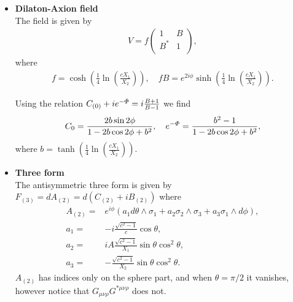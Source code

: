 \documentclass[11pt]{article}
\let\oldPhi=\Phi
\renewcommand{\Phi}{\mathnormal{\oldPhi}}
\begin{document}
\begin{itemize}
  \item \textbf{Dilaton-Axion field}\\
The field is given by
\begin{align}
V = f\left(
  \begin{array}{cc}
    1 & B \\
    B^* & 1 \\
  \end{array}
\right),
\end{align}
where
\begin{align}
f = \cosh\left(\frac{1}{4}\ln\left(\frac{c X_1}{X_2}\right)\right),\quad
f B = e^{2 i \phi}\sinh\left(\frac{1}{4}\ln\left(\frac{c X_1}{X_2}\right)\right).
\end{align}

Using the relation $C_{(0)} + i e^{-\Phi} = i\frac{B+1}{B-1}$
we find
\begin{align}
C_0 = \frac{2 b \sin 2\phi}{1-2 b \cos 2\phi + b^2},\quad
e^{-\Phi} = \frac{b^2 - 1}{1-2 b \cos 2\phi + b^2},
\end{align}
where $b = \tanh\left(\frac{1}{4}\ln\left(\frac{c X_1}{X_2}\right)\right)$.


  \item \textbf{Three form}\\
  The antisymmetric three form is given by $F_{(3)} = d A_{(2)} = d\left(C_{(2)} + i B_{(2)}\right)$ where \cite{Pilch:2000ue,Pilch:2003jg}
\begin{align}
A_{(2)} = & e^{i \phi}\left(a_1 d\theta \wedge \sigma_1 + a_2 \sigma_2 \wedge \sigma_3 + a_3 \sigma_1 \wedge d\phi\right),\nonumber\\
a_1 = & - i \frac{\sqrt{c^2-1}}{c}\cos\theta,\nonumber\\
a_2 =  & i A  \frac{\sqrt{c^2-1}}{X_1}\sin \theta \cos^2 \theta,\nonumber\\
a_3 =  &  -\frac{\sqrt{c^2-1}}{X_2}\sin \theta \cos^2 \theta.
\end{align}
$A_{(2)}$ has indices only on the sphere part, and when $\theta = \pi/2$ it vanishes, however notice that $G_{\mu\nu\rho}G^{* \mu\nu\rho}$ does not.


\end{itemize}
\end{document}
